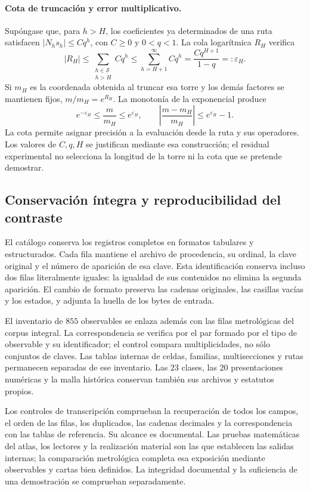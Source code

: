 \paragraph{Cota de truncación y error multiplicativo.}
Supóngase que, para \(h>H\), los coeficientes ya determinados de una
ruta satisfacen \(|N_hs_h|\leq Cq^h\), con \(C\geq0\) y
\(0<q<1\). La cola logarítmica \(R_H\) verifica
\[
 |R_H|\leq\sum_{\substack{h\in\mathcal S\\h>H}}Cq^h
 \leq\sum_{h=H+1}^{\infty}Cq^h
 =\frac{Cq^{H+1}}{1-q}=:\varepsilon_H.
\]
Si \(m_H\) es la coordenada obtenida al truncar esa torre y los demás
factores se mantienen fijos, \(m/m_H=e^{R_H}\). La monotonía de la
exponencial produce
\[
 e^{-\varepsilon_H}\leq\frac{m}{m_H}\leq e^{\varepsilon_H},
 \qquad
 \left|\frac{m-m_H}{m_H}\right|\leq e^{\varepsilon_H}-1.
\]
La cota permite asignar precisión a la evaluación desde la ruta y sus
operadores. Los valores de \(C,q,H\) se justifican mediante esa
construcción; el residual experimental no selecciona la longitud de la
torre ni la cota que se pretende demostrar.

\subsection{Conservación íntegra y reproducibilidad del contraste}
\label{subsec:vi-catalogo-reproducible}

El catálogo conserva los registros completos en formatos tabulares y
estructurados. Cada fila mantiene el archivo de procedencia, su ordinal,
la clave original y el número de aparición de esa clave. Esta
identificación conserva incluso dos filas literalmente iguales: la
igualdad de sus contenidos no elimina la segunda aparición. El cambio
de formato preserva las cadenas originales, las casillas vacías y los
estados, y adjunta la huella de los bytes de entrada.

El inventario de \(855\) observables se enlaza además con las filas
metrológicas del corpus integral. La correspondencia se verifica
por el par formado por el tipo de observable y su identificador; el
control compara multiplicidades, no sólo conjuntos de claves. Las tablas
internas de celdas, familias, multisecciones y rutas permanecen separadas
de ese inventario. Las \(23\) clases, las \(20\) presentaciones
numéricas y la malla histórica conservan también sus archivos y estatutos
propios.

Los controles de transcripción comprueban la recuperación de todos los
campos, el orden de las filas, los duplicados, las cadenas decimales y la
correspondencia con las tablas de referencia. Su alcance es documental.
Las pruebas matemáticas del atlas, los lectores y la realización material
son las que establecen las salidas internas; la comparación metrológica
completa esa exposición mediante observables y cartas bien definidos.
La integridad documental y la suficiencia de una demostración se
comprueban separadamente.


